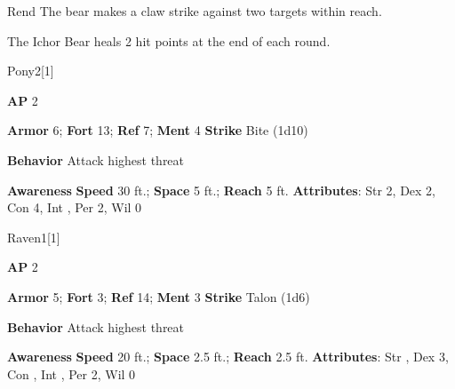 \begin{freeability}{Rend}
The bear makes a claw strike against two targets within reach.
\end{freeability}

The Ichor Bear heals 2 hit points at the end of each round.

\begin{monsection}{Pony}{2}[1]
\vspace{-1em}\vspace{-1em}
\begin{spellcontent}
\begin{spelltargetinginfo}
{\textbf{AP} 2}

\pari \textbf{Armor} 6;
\textbf{Fort} 13;
\textbf{Ref} 7;
\textbf{Ment} 4
\pari \textbf{Strike} Bite  (1d10)



\pari \textbf{Behavior} Attack highest threat
\end{spelltargetinginfo}
\end{spellcontent}

\begin{monsterfooter}
\pari \textbf{Awareness} 
\pari \textbf{Speed} 30 ft.;
\textbf{Space} 5 ft.;
\textbf{Reach} 5 ft.
\pari \textbf{Attributes}:
Str 2,
Dex 2,
Con 4,
Int ,
Per 2,
Wil 0
\end{monsterfooter}
\end{monsection}

\begin{monsection}{Raven}{1}[1]
\vspace{-1em}\vspace{-1em}
\begin{spellcontent}
\begin{spelltargetinginfo}
{\textbf{AP} 2}

\pari \textbf{Armor} 5;
\textbf{Fort} 3;
\textbf{Ref} 14;
\textbf{Ment} 3
\pari \textbf{Strike} Talon  (1d6)



\pari \textbf{Behavior} Attack highest threat
\end{spelltargetinginfo}
\end{spellcontent}

\begin{monsterfooter}
\pari \textbf{Awareness} 
\pari \textbf{Speed} 20 ft.;
\textbf{Space} 2.5 ft.;
\textbf{Reach} 2.5 ft.
\pari \textbf{Attributes}:
Str ,
Dex 3,
Con ,
Int ,
Per 2,
Wil 0
\end{monsterfooter}
\end{monsection}

